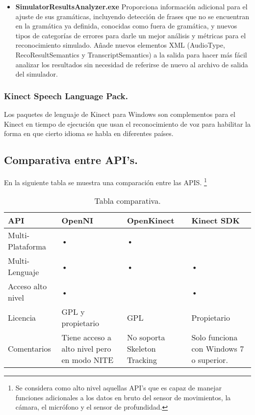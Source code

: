 \documentclass[11pt,a4paper]{article}
\begin{document}
\begin{itemize}
\item \textbf{SimulatorResultsAnalyzer.exe} Proporciona información adicional para el ajuste de sus gramáticas, incluyendo detección de frases que no se encuentran en la gramática ya definida, conocidas como fuera de gramática, y nuevos tipos de categorías de errores para darle un mejor análisis y métricas para el reconocimiento simulado. Añade nuevos elementos XML (AudioType, RecoResultSemantics y TranscriptSemantics) a la salida para hacer más fácil analizar los resultados sin necesidad de referirse de nuevo al archivo de salida del simulador.
\end{itemize} 

\subsubsection{Kinect Speech Language Pack.}
Los paquetes de lenguaje de Kinect para Windows son complementos para el Kinect en tiempo de ejecución que usan el reconocimiento de voz para habilitar la forma en que cierto idioma se habla en diferentes países.

\subsection{Comparativa entre API's.}
En la siguiente tabla se muestra una comparación entre las APIS. \footnote{Se considera como alto nivel aquellas API's que es capaz de manejar funciones adicionales a los datos en bruto del sensor de movimientos, la cámara, el micrófono y el sensor de profundidad.}
\newpage
\begin{table}
\begin{tabular}{||p{2.5cm}||p{2.5cm}||p{2.5cm}||p{2.5cm}||}
\hline API & OpenNI & OpenKinect & Kinect SDK \\ 
\hline Multi-Plataforma & • & • &  \\ 
\hline Multi-Lenguaje & • & • & • \\ 
\hline Acceso alto nivel & • &  & • \\ 
\hline Licencia & GPL y propietario & GPL & Propietario \\ 
\hline Comentarios & Tiene acceso a alto nivel pero en modo NITE & No soporta Skeleton Tracking & Solo funciona con Windows 7 o superior. \\ 
\hline 
\end{tabular} 
\caption{Tabla comparativa.}
\end{table}

\end{document}
